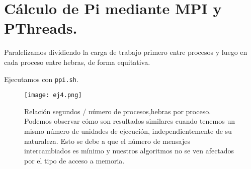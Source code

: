 \section{Cálculo de Pi mediante MPI y PThreads.}

Paralelizamos dividiendo la carga de trabajo primero entre procesos y luego en cada proceso
entre hebras, de forma equitativa.

Ejecutamos con \texttt{ppi.sh}.

\begin{figure}[H]
    \centering
    \texttt{[image: ej4.png]}
    \caption{Relación segundos / número de procesos,hebras por proceso. Podemos observar cómo son resultados
    similares cuando tenemos un mismo número de unidades de ejecución, independientemente de su naturaleza.
    Esto se debe a que el número de mensajes intercambiados es mínimo y nuestros algoritmos no se ven afectados
    por el tipo de acceso a memoria.}
\end{figure}